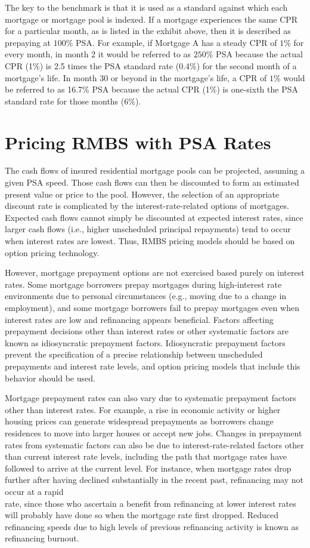 \documentclass[11pt]{article}
\begin{document}
The key to the benchmark is that it is used as a standard against which each mortgage or mortgage pool is indexed. If a mortgage experiences the same CPR for a particular month, as is listed in the exhibit above, then it is described as prepaying at $100 \%$ PSA. For example, if Mortgage A has a steady CPR of $1 \%$ for every month, in month 2 it would be referred to as $250 \%$ PSA because the actual CPR (1\%) is 2.5 times the PSA standard rate (0.4\%) for the second month of a mortgage's life. In month 30 or beyond in the mortgage's life, a CPR of $1 \%$ would be referred to as 16.7\% PSA because the actual CPR (1\%) is one-sixth the PSA standard rate for those months (6\%).

\section*{Pricing RMBS with PSA Rates}
The cash flows of insured residential mortgage pools can be projected, assuming a given PSA speed. Those cash flows can then be discounted to form an estimated present value or price to the pool. However, the selection of an appropriate discount rate is complicated by the interest-rate-related options of mortgages. Expected cash flows cannot simply be discounted at expected interest rates, since larger cash flows (i.e., higher unscheduled principal repayments) tend to occur when interest rates are lowest. Thus, RMBS pricing models should be based on option pricing technology.

However, mortgage prepayment options are not exercised based purely on interest rates. Some mortgage borrowers prepay mortgages during high-interest rate environments due to personal circumstances (e.g., moving due to a change in employment), and some mortgage borrowers fail to prepay mortgages even when interest rates are low and refinancing appears beneficial. Factors affecting prepayment decisions other than interest rates or other systematic factors are known as idiosyncratic prepayment factors. Idiosyncratic prepayment factors prevent the specification of a precise relationship between unscheduled prepayments and interest rate levels, and option pricing models that include this behavior should be used.

Mortgage prepayment rates can also vary due to systematic prepayment factors other than interest rates. For example, a rise in economic activity or higher housing prices can generate widespread prepayments as borrowers change residences to move into larger houses or accept new jobs. Changes in prepayment rates from systematic factors can also be due to interest-rate-related factors other than current interest rate levels, including the path that mortgage rates have followed to arrive at the current level. For instance, when mortgage rates drop further after having declined substantially in the recent past, refinancing may not occur at a rapid\\
rate, since those who ascertain a benefit from refinancing at lower interest rates will probably have done so when the mortgage rate first dropped. Reduced refinancing speeds due to high levels of previous refinancing activity is known as refinancing burnout.
\end{document}
